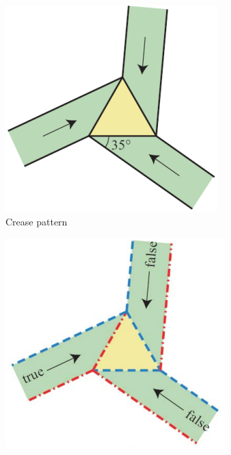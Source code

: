 \begin{figure}[h!tbp]
  \centering
  \begin{subfigure}{.3\textwidth}
    \includegraphics[width=\textwidth]{origami-data/clause}
    \caption{Crease pattern}
    \label{clause-creases}
  \end{subfigure}
  \begin{subfigure}{.3\textwidth}
    \includegraphics[width=\textwidth]{origami-data/clause-fold-1}

\end{subfigure}
\end{figure}
